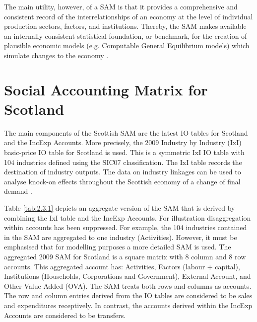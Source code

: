\bigskip

The main utility, however, of a SAM is that it provides a comprehensive and consistent record of the interrelationships of an economy at the level of individual production sectors, factors, and institutions. Thereby, the SAM makes available an internally consistent statistical foundation, or benchmark, for the creation of plausible economic models (e.g. Computable General Equilibrium models) which simulate changes to the economy \cite{Reinert1997a}.     

\newpage
\section{Social Accounting Matrix for Scotland} 
\label{sec:2.3}

The main components of the Scottish SAM are the latest IO tables for Scotland \cite{ScottishGovernment2013a} and the IncExp Accounts. More precisely, the 2009 Industry by Industry (IxI) basic-price IO table for Scotland is used. This is a symmetric IxI IO table with 104 industries defined using the SIC07 classification. The IxI table records the destination of industry outputs. The data on industry linkages can be used to analyse knock-on effects throughout the Scottish economy of a change of final demand \cite{ScottishGovernment2011a}. 

\bigskip

Table \ref{tab:2.3.1} depicts an aggregate version of the SAM that is derived by combining the IxI table and the IncExp Accounts. For illustration disaggregation within accounts has been suppressed. For example, the 104 industries contained in the SAM are aggregated to one industry (Activities). However, it must be emphasised that for modelling purposes a more detailed SAM is used. The aggregated 2009 SAM for Scotland is a square matrix with 8 column and 8 row accounts. This aggregated account has: Activities, Factors (labour + capital), Institutions (Households, Corporations and Government), External Account, and Other Value Added (OVA). The SAM treats both rows and columns as accounts. The row and column entries derived from the IO tables are considered to be sales and expenditures receptively. In contrast, the accounts derived within the IncExp Accounts are considered to be transfers. 

\bigskip

